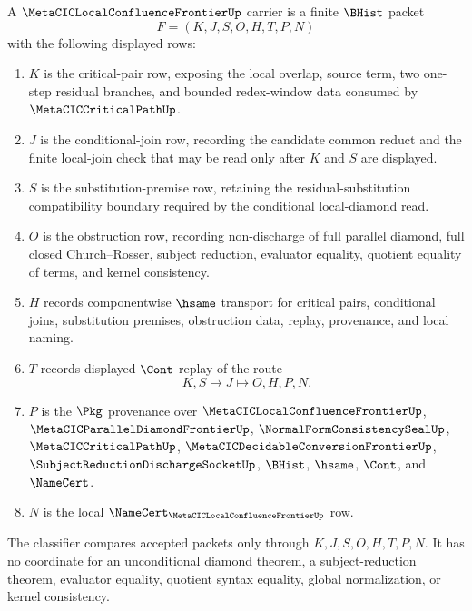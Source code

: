\begin{definition}
\label{def:metacic-local-confluence-frontier-carrier}
A $\MetaCICLocalConfluenceFrontierUp$ carrier is a finite $\BHist$ packet
$$
F=(K,J,S,O,H,T,P,N)
$$
with the following displayed rows:
\begin{enumerate}
\item $K$ is the critical-pair row, exposing the local overlap, source term, two one-step residual branches, and bounded redex-window data consumed by $\MetaCICCriticalPathUp$.
\item $J$ is the conditional-join row, recording the candidate common reduct and the finite local-join check that may be read only after $K$ and $S$ are displayed.
\item $S$ is the substitution-premise row, retaining the residual-substitution compatibility boundary required by the conditional local-diamond read.
\item $O$ is the obstruction row, recording non-discharge of full parallel diamond, full closed Church--Rosser, subject reduction, evaluator equality, quotient equality of terms, and kernel consistency.
\item $H$ records componentwise $\hsame$ transport for critical pairs, conditional joins, substitution premises, obstruction data, replay, provenance, and local naming.
\item $T$ records displayed $\Cont$ replay of the route
$$
K,S \longmapsto J \longmapsto O,H,P,N .
$$
\item $P$ is the $\Pkg$ provenance over $\MetaCICLocalConfluenceFrontierUp$, $\MetaCICParallelDiamondFrontierUp$, $\NormalFormConsistencySealUp$, $\MetaCICCriticalPathUp$, $\MetaCICDecidableConversionFrontierUp$, $\SubjectReductionDischargeSocketUp$, $\BHist$, $\hsame$, $\Cont$, and $\NameCert$.
\item $N$ is the local $\NameCert_{\MetaCICLocalConfluenceFrontierUp}$ row.
\end{enumerate}
The classifier compares accepted packets only through $K,J,S,O,H,T,P,N$. It has no coordinate for an unconditional diamond theorem, a subject-reduction theorem, evaluator equality, quotient syntax equality, global normalization, or kernel consistency.
\end{definition}

